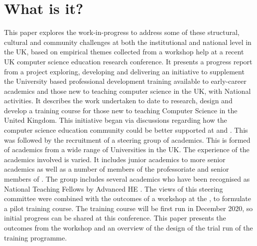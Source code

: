 \documentclass[sigconf]{acmart}
\begin{document}


\maketitle

\section{What is it?}	
This paper explores the work-in-progress to address some of these structural, cultural and community challenges at both the institutional and national level in the UK, based on empirical themes collected from a workshop help at a recent UK computer science education research conference. It presents a progress report from a project exploring, developing and delivering an initiative to supplement the University based professional development training available to early-career academics and those new to teaching computer science in the UK, with National activities. It describes the work undertaken to date to research, design and develop a training course for those new to teaching Computer Science in the United Kingdom. This initiative began via discussions regarding how the computer science education community could be better supported at   and  . This was followed by the recruitment of a steering group of academics. This is formed of academics from a wide range of Universities in the UK. The experience of the academics involved is varied. It includes junior academics to more senior academics as well as a number of members of the professoriate and senior members of . The group includes several academics who have been recognised as National Teaching Fellows by Advanced HE \cite{AdvancedHENTF}. The views of this steering committee were combined with the outcomes of a workshop at the  , to formulate a pilot training course. The training course will be first run in December 2020, so initial progress can be shared at this conference. This paper presents the outcomes from the workshop and an overview of the design of the trial run of the training programme.
\end{document}
